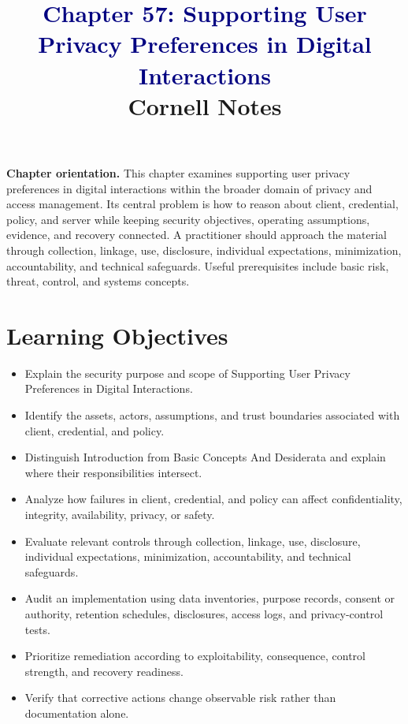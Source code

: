 \documentclass[11pt]{article}
\title{\textcolor{Navy}{Chapter 57: Supporting User Privacy Preferences in Digital Interactions}\\[2mm]\large Cornell Notes}
\author{}
\date{}
\begin{document}
\maketitle
\thispagestyle{fancy}
\vspace{-1.5em}
\begin{orientationbox}
\textbf{Chapter orientation.} This chapter examines supporting user privacy preferences in digital interactions within the broader domain of privacy and access management. Its central problem is how to reason about client, credential, policy, and server while keeping security objectives, operating assumptions, evidence, and recovery connected. A practitioner should approach the material through collection, linkage, use, disclosure, individual expectations, minimization, accountability, and technical safeguards. Useful prerequisites include basic risk, threat, control, and systems concepts.
\end{orientationbox}
\section*{Learning Objectives}
\begin{itemize}
\item Explain the security purpose and scope of Supporting User Privacy Preferences in Digital Interactions.
\item Identify the assets, actors, assumptions, and trust boundaries associated with client, credential, and policy.
\item Distinguish Introduction from Basic Concepts And Desiderata and explain where their responsibilities intersect.
\item Analyze how failures in client, credential, and policy can affect confidentiality, integrity, availability, privacy, or safety.
\item Evaluate relevant controls through collection, linkage, use, disclosure, individual expectations, minimization, accountability, and technical safeguards.
\item Audit an implementation using data inventories, purpose records, consent or authority, retention schedules, disclosures, access logs, and privacy-control tests.
\item Prioritize remediation according to exploitability, consequence, control strength, and recovery readiness.
\item Verify that corrective actions change observable risk rather than documentation alone.
\end{itemize}
\end{document}
